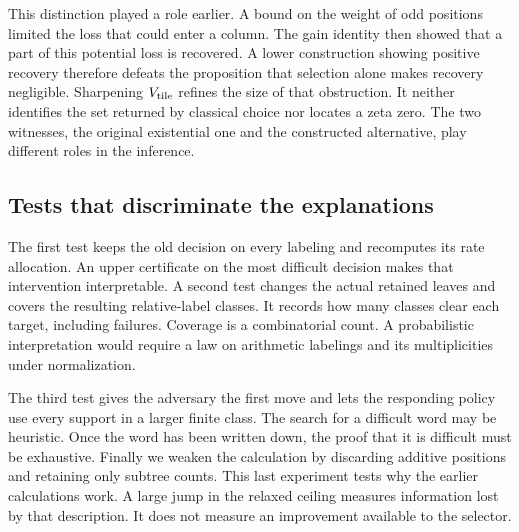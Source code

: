 This distinction played a role earlier. A bound on the weight of odd positions limited the loss that could enter a column. The gain identity then showed that a part of this potential loss is recovered. A lower construction showing positive recovery therefore defeats the proposition that selection alone makes recovery negligible. Sharpening \(V_{\rm tile}\) refines the size of that obstruction. It neither identifies the set returned by classical choice nor locates a zeta zero. The two witnesses, the original existential one and the constructed alternative, play different roles in the inference.

\subsection{Tests that discriminate the explanations}
The first test keeps the old decision on every labeling and recomputes its rate allocation. An upper certificate on the most difficult decision makes that intervention interpretable. A second test changes the actual retained leaves and covers the resulting relative-label classes. It records how many classes clear each target, including failures. Coverage is a combinatorial count. A probabilistic interpretation would require a law on arithmetic labelings and its multiplicities under normalization.

The third test gives the adversary the first move and lets the responding policy use every support in a larger finite class. The search for a difficult word may be heuristic. Once the word has been written down, the proof that it is difficult must be exhaustive. Finally we weaken the calculation by discarding additive positions and retaining only subtree counts. This last experiment tests why the earlier calculations work. A large jump in the relaxed ceiling measures information lost by that description. It does not measure an improvement available to the selector.
